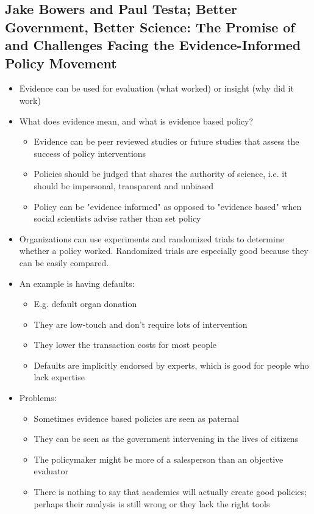 \documentclass[11pt]{article}
\begin{document}
\subsection{Jake Bowers and Paul Testa; Better Government, Better Science: The Promise of and Challenges Facing the Evidence-Informed Policy Movement}
\label{sec:org2165de7}
\begin{itemize}
\item Evidence can be used for evaluation (what worked) or insight (why did it work)
\item What does evidence mean, and what is evidence based policy?
\begin{itemize}
\item Evidence can be peer reviewed studies or future studies that assess the
success of policy interventions
\item Policies should be judged that shares the authority of science, i.e. it
should be impersonal, transparent and unbiased
\item Policy can be "evidence informed" as opposed to "evidence based" when social
scientists advise rather than set policy
\end{itemize}
\item Organizations can use experiments and randomized trials to determine whether a
policy worked. Randomized trials are especially good because they can be
easily compared.
\item An example is having defaults:
\begin{itemize}
\item E.g. default organ donation
\item They are low-touch and don't require lots of intervention
\item They lower the transaction costs for most people
\item Defaults are implicitly endorsed by experts, which is good for people who
lack expertise
\end{itemize}
\item Problems:
\begin{itemize}
\item Sometimes evidence based policies are seen as paternal
\item They can be seen as the government intervening in the lives of citizens
\item The policymaker might be more of a salesperson than an objective evaluator
\item There is nothing to say that academics will actually create good policies;
perhaps their analysis is still wrong or they lack the right tools

\end{itemize}
\end{itemize}
\end{document}
